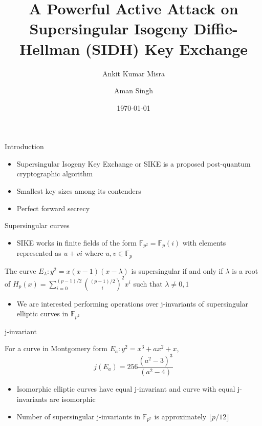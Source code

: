 \documentclass{beamer}
\title{A Powerful Active Attack on Supersingular Isogeny Diffie-Hellman (SIDH) Key Exchange}
\author{Ankit Kumar Misra \and Aman Singh}
\institute{CS 741: Advanced Network Security and Cryptography, \\Autumn 2022, IIT Bombay}
\date{\today}
\begin{document}
\frame{\titlepage}


\begin{frame}{Introduction}
\begin{itemize}
    \item Supersingular Isogeny Key Exchange or SIKE is a proposed post-quantum cryptographic algorithm
    \item Smallest key sizes among its contenders
    \item Perfect forward secrecy
\end{itemize}
\end{frame}

\begin{frame}{Supersingular curves}
\begin{itemize}
    \item SIKE works in finite fields of the form $\mathbb{F}_{p^2} = \mathbb{F}_p(i)$ with elements represented as $u+vi$ where $u,v\in\mathbb{F}_p$
\end{itemize}
\begin{definition}
The curve $E_\lambda: y^2 = x(x-1)(x-\lambda)$ is supersingular if and only if $\lambda$ is a root of $H_p(x) = \sum_{i=0}^{(p-1)/2} {(p-1)/2 \choose i}^2 x^i$ such that $\lambda \neq 0,1$
\end{definition}
\begin{itemize}
    \item We are interested performing operations over j-invariants of supersingular elliptic curves in $\mathbb{F}_{p^2}$
\end{itemize}
\end{frame}

\begin{frame}{j-invariant}
\begin{definition}
    For a curve in Montgomery form $E_a: y^2 = x^3 + ax^2 + x$, 
    $$j(E_a) = 256\dfrac{(a^2-3)^3}{(a^2-4)}$$
\end{definition}
\begin{itemize}
    \item Isomorphic elliptic curves have equal j-invariant and curve with equal j-invariants are isomorphic
    \item Number of supersingular j-invariants in $\mathbb{F}_{p^2}$ is approximately $\lfloor p/12 \rfloor$ 
\end{itemize}
\end{frame}
\end{document}

